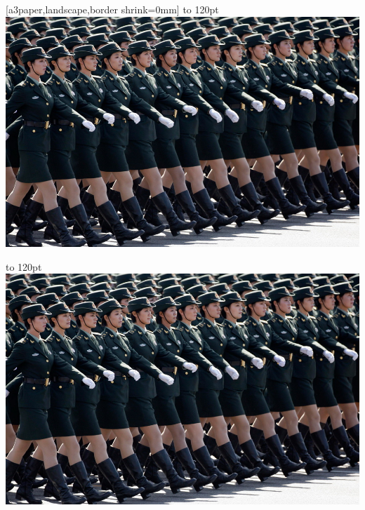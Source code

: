\documentclass[twoside]{book}
\makeatletter
\providecommand{\cleartoevenpage}[1][\@empty]{%
 \clearpage%
 \ifodd\c@page\null#1\clearpage\fi}
\makeatother
\begin{document}
\mainmatter
\null\newpage
{}[a3paper,landscape,border shrink=0mm]
\cleartoevenpage
\checkoddpage%
{\parindent0pt
\vbox to 120pt{\lipsum[1]}%
\includegraphics[height=0.78\textheight]{china-05}}

{\parindent0pt
\vbox to 120pt{\lipsum[1]}%
\hspace*{\dimexpr(-2in-\textwidth-2\evensidemargin)}
\includegraphics[height=0.78\textheight]{china-05}}
\hspace{1em}\parbox[b]{0.35\textwidth}{\lipsum[1-2]}
\end{document}
